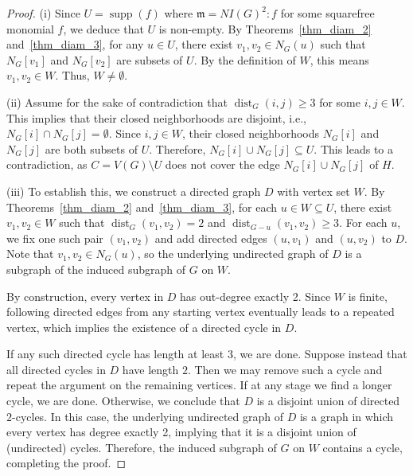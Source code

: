 \documentclass[10pt,a4paper]{amsart}
\DeclareMathOperator{\dist}{dist}
\DeclareMathOperator{\supp}{supp}
\newcommand{\mm}{\mathfrak m}
\begin{document}
\begin{proof}
(i) Since $U = \supp (f)$ where $\mm = NI(G)^2 : f$ for some squarefree monomial $f$, we deduce that $U$ is non-empty. By Theorems~\ref{thm_diam_2} and~\ref{thm_diam_3}, for any $u \in U$, there exist $v_1, v_2 \in N_G(u)$ such that $N_G[v_1]$ and $N_G[v_2]$ are subsets of $U$. By the definition of $W$, this means $v_1, v_2 \in W$. Thus, $W \neq \emptyset$.

\vspace{1em} %

(ii) Assume for the sake of contradiction that $\dist_G(i,j) \ge 3$ for some $i,j \in W$. This implies that their closed neighborhoods are disjoint, i.e., $N_G[i] \cap N_G[j] = \emptyset$. Since $i,j \in W$, their closed neighborhoods $N_G[i]$ and $N_G[j]$ are both subsets of $U$. Therefore, $N_G[i] \cup N_G[j] \subseteq U$. This leads to a contradiction, as $C = V(G) \setminus U$ does not cover the edge $N_G[i] \cup N_G[j]$ of $H$.

\vspace{1em}

(iii) To establish this, we construct a directed graph $D$ with vertex set $W$. By Theorems~\ref{thm_diam_2} and~\ref{thm_diam_3}, for each $u \in W \subseteq U$, there exist $v_1, v_2 \in W$ such that $\dist_G(v_1, v_2) = 2$ and $\dist_{G - u}(v_1, v_2) \geq 3$. For each $u$, we fix one such pair $(v_1, v_2)$ and add directed edges $(u, v_1)$ and $(u, v_2)$ to $D$. Note that $v_1, v_2 \in N_G(u)$, so the underlying undirected graph of $D$ is a subgraph of the induced subgraph of $G$ on $W$.

By construction, every vertex in $D$ has out-degree exactly 2. Since $W$ is finite, following directed edges from any starting vertex eventually leads to a repeated vertex, which implies the existence of a directed cycle in $D$.

If any such directed cycle has length at least $3$, we are done. Suppose instead that all directed cycles in $D$ have length $2$. Then we may remove such a cycle and repeat the argument on the remaining vertices. If at any stage we find a longer cycle, we are done. Otherwise, we conclude that $D$ is a disjoint union of directed $2$-cycles. In this case, the underlying undirected graph of $D$ is a graph in which every vertex has degree exactly 2, implying that it is a disjoint union of (undirected) cycles. Therefore, the induced subgraph of $G$ on $W$ contains a cycle, completing the proof.
\end{proof}
\end{document}
